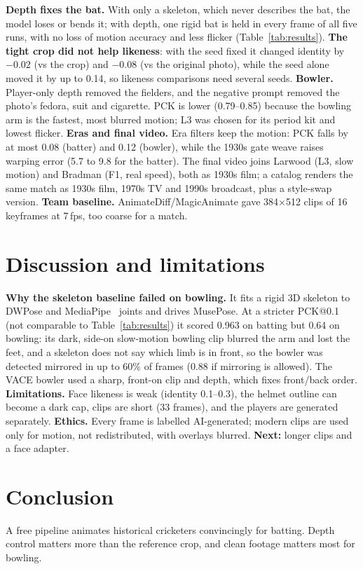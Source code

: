 \documentclass[11pt,a4paper,twocolumn]{article}
\begin{document}
\textbf{Depth fixes the bat.} With only a skeleton, which never describes the bat, the model loses or bends it;
with depth, one rigid bat is held in every frame of all five runs, with no loss of motion accuracy and less
flicker (Table~\ref{tab:results}). \textbf{The tight crop did not help likeness}: with the seed fixed it changed
identity by $-0.02$ (vs the crop) and $-0.08$ (vs the original photo), while the seed alone moved it by up to
0.14, so likeness comparisons need several seeds. \textbf{Bowler.} Player-only depth removed the fielders, and
the negative prompt removed the photo's fedora, suit and cigarette. PCK is lower (0.79--0.85) because the
bowling arm is the fastest, most blurred motion; L3 was chosen for its period kit and lowest flicker.
\textbf{Eras and final video.} Era filters keep the motion: PCK falls by at most 0.08 (batter) and 0.12
(bowler), while the 1930s gate weave raises warping error (5.7 to 9.8 for the batter). The final video joins
Larwood (L3, slow motion) and Bradman (F1, real speed), both as 1930s film; a catalog renders the same match as
1930s film, 1970s TV and 1990s broadcast, plus a style-swap version. \textbf{Team baseline.} \mbox{AnimateDiff}/MagicAnimate gave 384$\times$512 clips of 16 keyframes at 7\,fps,
too coarse for a match.

\section{Discussion and limitations}\label{sec:disc}
\textbf{Why the skeleton baseline failed on bowling.} It fits a rigid 3D skeleton to DWPose and
MediaPipe~\cite{mediapipe} joints and drives MusePose. At a stricter PCK@0.1 (not comparable to
Table~\ref{tab:results}) it scored 0.963 on batting but 0.64 on bowling: its dark, side-on slow-motion bowling
clip blurred the arm and lost the feet, and a skeleton does not say which limb is in front, so the bowler was
detected mirrored in up to 60\% of frames (0.88 if mirroring is allowed). The VACE bowler used a sharp,
front-on clip and depth, which fixes front/back order. \textbf{Limitations.} Face likeness is
weak (identity 0.1--0.3), the helmet outline can become a dark cap, clips are short (33 frames), and the players
are generated separately. \textbf{Ethics.} Every frame is labelled AI-generated; modern clips are used only for motion, not
redistributed, with overlays blurred. \textbf{Next:} longer clips and a face adapter.

\section{Conclusion}
A free pipeline animates historical cricketers convincingly for batting. Depth control matters more than the
reference crop, and clean footage matters most for bowling.
\end{document}
